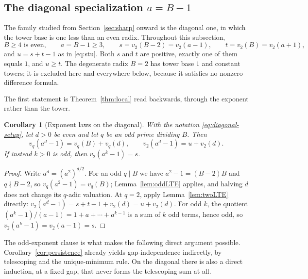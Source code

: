 \documentclass[11pt,letterpaper]{article}
\numberwithin{equation}{section}
\newtheorem{corollary}[theorem]{Corollary}
\theoremstyle{definition}
\theoremstyle{remark}
\begin{document}
\subsection{The diagonal specialization \texorpdfstring{$a=B-1$}{a = B-1}}\label{sec:diagonal-local}

The family studied from Section~\ref{sec:sharp} onward is the diagonal one, in which the tower base is one less than an even radix. Throughout this subsection,
\begin{equation}\label{eq:diagonal-setup}
 B\ge4\text{ is even},\qquad a=B-1\ge3,\qquad
 s=v_2(B-2)=v_2(a-1),\qquad t=v_2(B)=v_2(a+1),
\end{equation}
and $u=s+t-1$ as in \eqref{eq:stu}. Both $s$ and $t$ are positive, exactly one of them equals $1$, and $u\ge t$. The degenerate radix $B=2$ has tower base $1$ and constant towers; it is excluded here and everywhere below, because it satisfies no nonzero-difference formula.

The first statement is Theorem~\ref{thm:local} read backwards, through the exponent rather than the tower.

\begin{corollary}[Exponent laws on the diagonal]\label{cor:even-exponent}
With the notation \eqref{eq:diagonal-setup}, let $d>0$ be even and let $q$ be an odd prime dividing $B$. Then
\begin{equation}\label{eq:diag-odd}
 v_q(a^d-1)=v_q(B)+v_q(d),
 \qquad
 v_2(a^d-1)=u+v_2(d).
\end{equation}
If instead $k>0$ is odd, then $v_2(a^k-1)=s$.
\end{corollary}
\begin{proof}
Write $a^d=(a^2)^{d/2}$. For an odd $q\mid B$ we have $a^2-1=(B-2)B$ and $q\nmid B-2$, so $v_q(a^2-1)=v_q(B)$; Lemma~\ref{lem:oddLTE} applies, and halving $d$ does not change its $q$-adic valuation. At $q=2$, apply Lemma~\ref{lem:twoLTE} directly: $v_2(a^d-1)=s+t-1+v_2(d)=u+v_2(d)$. For odd $k$, the quotient $(a^k-1)/(a-1)=1+a+\cdots+a^{k-1}$ is a sum of $k$ odd terms, hence odd, so $v_2(a^k-1)=v_2(a-1)=s$.
\end{proof}

The odd-exponent clause is what makes the following direct argument possible. Corollary~\ref{cor:persistence} already yields gap-independence indirectly, by telescoping and the unique-minimum rule. On the diagonal there is also a direct induction, at a fixed gap, that never forms the telescoping sum at all.
\end{document}
